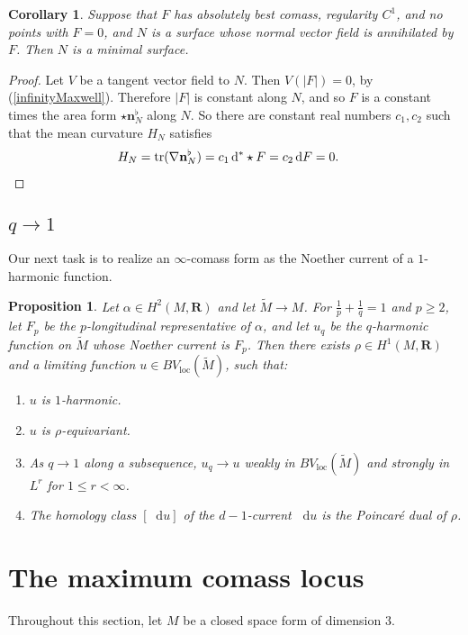 \documentclass[reqno,11pt]{amsart}
\newcommand{\RR}{\mathbf{R}}
\newcommand*\dif{\mathop{}\!\mathrm{d}}
\DeclareMathOperator{\tr}{tr}
\newcommand{\normal}{\mathbf n}
\newcommand{\loc}{\mathrm{loc}}
\newtheorem{proposition}[theorem]{Proposition}
\newtheorem{corollary}[theorem]{Corollary}
\theoremstyle{definition}
\numberwithin{equation}{section}
\begin{document}
\begin{corollary}
Suppose that $F$ has absolutely best comass, regularity $C^1$, and no points with $F = 0$, and $N$ is a surface whose normal vector field is annihilated by $F$.
Then $N$ is a minimal surface.
\end{corollary}
\begin{proof}
Let $V$ be a tangent vector field to $N$. Then $V(|F|) = 0$, by (\ref{infinityMaxwell}).
Therefore $|F|$ is constant along $N$, and so $F$ is a constant times the area form $\star \normal_N^\flat$ along $N$.
So there are constant real numbers $c_1, c_2$ such that the mean curvature $H_N$ satisfies
\begin{align*}
H_N &= \tr(\nabla \normal_N^\flat) = c_1 \dif^* \star F = c_2 \dif F = 0. \qedhere
\end{align*}
\end{proof}


\subsection{\texorpdfstring{$q \to 1$}{The limit as q goes to 1}}
Our next task is to realize an $\infty$-comass form as the Noether current of a $1$-harmonic function.

\begin{proposition}
Let $\alpha \in H^2(M, \RR)$ and let $\tilde M \to M$.
For $\frac{1}{p} + \frac{1}{q} = 1$ and $p \geq 2$, let $F_p$ be the $p$-longitudinal representative of $\alpha$, and let $u_q$ be the $q$-harmonic function on $\tilde M$ whose Noether current is $F_p$.
Then there exists $\rho \in H^1(M, \RR)$ and a limiting function $u \in BV_\loc(\tilde M)$, such that:
\begin{enumerate}
\item $u$ is $1$-harmonic.
\item $u$ is $\rho$-equivariant.
\item As $q \to 1$ along a subsequence, $u_q \to u$ weakly in $BV_\loc(\tilde M)$ and strongly in $L^r$ for $1 \leq r < \infty$.
\item The homology class $[\dif u]$ of the $d-1$-current $\dif u$ is the Poincar\'e dual of $\rho$.
\end{enumerate}
\end{proposition}


\section{The maximum comass locus}
Throughout this section, let $M$ be a closed space form of dimension $3$.
\end{document}
